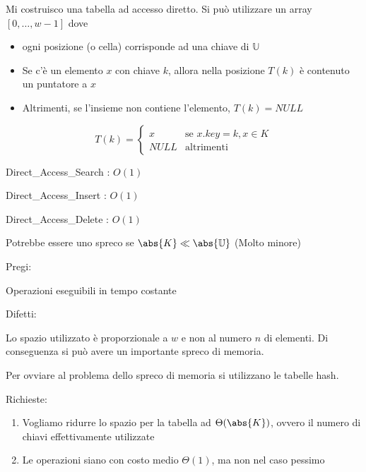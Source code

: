\documentclass[tikz]{article}
\providecommand{\tightlist}{%
  \setlength{\itemsep}{0pt}\setlength{\parskip}{0pt}}
\begin{document}
{Mi costruisco una tabella ad accesso diretto. Si può utilizzare un array $[0,\ldots,w-1]$ dove}

\begin{itemize}
\tightlist
\item
  {ogni posizione (o cella) corrisponde ad una chiave di $\mathbb{U}$}
\item
  {Se c'è un elemento $x$ con chiave $k$, allora nella posizione $T(k)$ è contenuto un puntatore a $x$}
\item
  {Altrimenti, se l'insieme non contiene l'elemento, $T(k) = NULL$}
\end{itemize}

\begin{equation}
T(k) = 
\begin{cases}
x & \mbox{se } x.key=k, x\in K \\ 
NULL & \mbox{altrimenti} 
\end{cases}
\end{equation}

{Direct\_Access\_Search : }$O(1)$



{Direct\_Access\_Insert : $O(1)$}



{Direct\_Access\_Delete : $O(1)$}



{Potrebbe essere uno spreco se $\abs{K} \ll \abs{\mathbb{U}}$ (Molto minore)}

{Pregi:}

{Operazioni eseguibili in tempo costante}

{Difetti:}

{Lo spazio utilizzato è proporzionale a $w$ e non al numero $n$ di elementi. Di conseguenza si può avere un importante spreco di memoria.}

{Per ovviare al problema dello spreco di memoria si utilizzano le tabelle hash.}

{Richieste:}

\begin{enumerate}
\tightlist
\item
  {Vogliamo ridurre lo spazio per la tabella ad $\Theta(\abs{K})$, ovvero il numero di chiavi
  effettivamente utilizzate}
\item
  {Le operazioni siano con costo medio $\Theta(1)$, ma non nel caso pessimo}
\end{enumerate}
\end{document}

